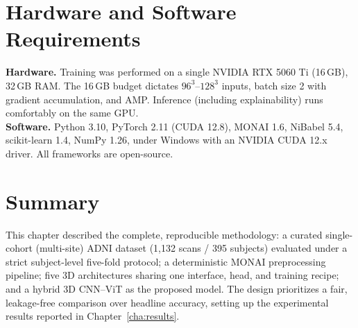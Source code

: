 \section{Hardware and Software Requirements}
\textbf{Hardware.} Training was performed on a single NVIDIA RTX 5060 Ti (16\,GB), 32\,GB RAM. The 16\,GB budget dictates $96^3$--$128^3$ inputs, batch size 2 with gradient accumulation, and AMP. Inference (including explainability) runs comfortably on the same GPU.\\
\textbf{Software.} Python 3.10, PyTorch 2.11 (CUDA 12.8), MONAI 1.6, NiBabel 5.4, scikit-learn 1.4, NumPy 1.26, under Windows with an NVIDIA CUDA 12.x driver. All frameworks are open-source.

\section{Summary}
This chapter described the complete, reproducible methodology: a curated single-cohort (multi-site) ADNI dataset (1{,}132 scans / 395 subjects) evaluated under a strict subject-level five-fold protocol; a deterministic MONAI preprocessing pipeline; five 3D architectures sharing one interface, head, and training recipe; and a hybrid 3D CNN--ViT as the proposed model. The design prioritizes a fair, leakage-free comparison over headline accuracy, setting up the experimental results reported in Chapter~\ref{cha:results}.
